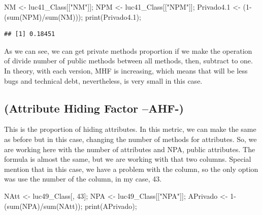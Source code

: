 \documentclass[
]{article}
\newenvironment{Shaded}{\begin{snugshade}}{\end{snugshade}}
\newcommand{\DecValTok}[1]{\textcolor[rgb]{0.00,0.00,0.81}{#1}}
\newcommand{\FloatTok}[1]{\textcolor[rgb]{0.00,0.00,0.81}{#1}}
\newcommand{\FunctionTok}[1]{\textcolor[rgb]{0.00,0.00,0.00}{#1}}
\newcommand{\NormalTok}[1]{#1}
\newcommand{\OtherTok}[1]{\textcolor[rgb]{0.56,0.35,0.01}{#1}}
\newcommand{\SpecialCharTok}[1]{\textcolor[rgb]{0.00,0.00,0.00}{#1}}
\newcommand{\StringTok}[1]{\textcolor[rgb]{0.31,0.60,0.02}{#1}}
\begin{document}
\begin{Shaded}
\begin{Highlighting}[]
\NormalTok{NM }\OtherTok{\textless{}{-}}\NormalTok{ luc41\_Class[[}\StringTok{"NM"}\NormalTok{]];}
\NormalTok{NPM }\OtherTok{\textless{}{-}}\NormalTok{ luc41\_Class[[}\StringTok{"NPM"}\NormalTok{]];}
\NormalTok{Privado4}\FloatTok{.1} \OtherTok{\textless{}{-}}\NormalTok{ (}\DecValTok{1}\SpecialCharTok{{-}}\NormalTok{(}\FunctionTok{sum}\NormalTok{(NPM)}\SpecialCharTok{/}\FunctionTok{sum}\NormalTok{(NM)));}
\FunctionTok{print}\NormalTok{(Privado4}\FloatTok{.1}\NormalTok{);}
\end{Highlighting}
\end{Shaded}

\begin{verbatim}
## [1] 0.18451
\end{verbatim}

As we can see, we can get private methods proportion if we make the
operation of divide number of public methods between all methods, then,
subtract to one. In theory, with each version, MHF is increasing, which
means that will be less bugs and technical debt, nevertheless, is very
small in this case.

\hypertarget{attribute-hiding-factor-ahf-}{%
\subsection{(Attribute Hiding Factor
--AHF-)}\label{attribute-hiding-factor-ahf-}}

This is the proportion of hiding attributes. In this metric, we can make
the same as before but in this case, changing the number of methods for
attributes. So, we are working here with the number of attributes and
NPA, public attributes. The formula is almost the same, but we are
working with that two columns. Special mention that in this case, we
have a problem with the column, so the only option was use the number of
the column, in my case, 43.

\begin{Shaded}
\begin{Highlighting}[]
\NormalTok{NAtt }\OtherTok{\textless{}{-}}\NormalTok{ luc49\_Class[, }\DecValTok{43}\NormalTok{];}
\NormalTok{NPA }\OtherTok{\textless{}{-}}\NormalTok{ luc49\_Class[[}\StringTok{"NPA"}\NormalTok{]];}
\NormalTok{APrivado }\OtherTok{\textless{}{-}} \DecValTok{1}\SpecialCharTok{{-}}\NormalTok{(}\FunctionTok{sum}\NormalTok{(NPA)}\SpecialCharTok{/}\FunctionTok{sum}\NormalTok{(NAtt));}
\FunctionTok{print}\NormalTok{(APrivado);}
\end{Highlighting}
\end{Shaded}
\end{document}
